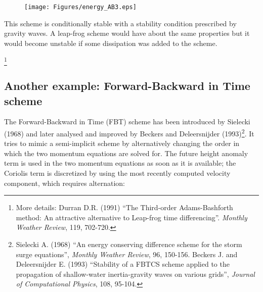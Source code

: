 	
	\begin{figure}
		\texttt{[image: Figures/energy\_AB3.eps]}
	\end{figure}
\hfill
	
	This scheme is conditionally stable with a stability condition prescribed by gravity waves. A leap-frog scheme would have about the same properties but it would become unstable if some dissipation was added to the scheme. \\
	

\medskip

\footnote{More details: Durran D.R. (1991) ``The Third-order Adams-Bashforth method: An attractive alternative to Leap-frog time differencing''. \emph{Monthly Weather Review}, 119, 702-720.}


\subsection{Another example: Forward-Backward in Time scheme}

The Forward-Backward in Time (FBT) scheme has been introduced by Sielecki (1968) and later analysed and improved by Beckers and Deleersnijder (1993)\footnote{Sielecki A. (1968) ``An energy conserving difference scheme for the storm surge equations'', \emph{Monthly Weather Review}, 96, 150-156. Beckers J. and Deleersnijder E. (1993) ``Stability of a FBTCS scheme applied to the propagation of shallow-water inertia-gravity waves on various grids'', \emph{Journal of Computational Physics}, 108, 95-104.}. It tries to mimic a semi-implicit scheme by alternatively changing the order in which the two momentum equations are solved for. The future height anomaly term is used in the two momentum equations as soon as it is available; the Coriolis term is discretized by using the most recently computed velocity component, which requires alternation:

